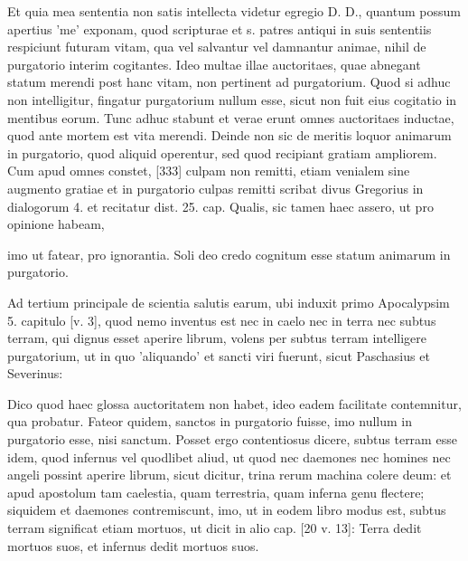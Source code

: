 Et quia mea sententia non satis intellecta videtur egregio D. D., quantum possum apertius 'me' exponam, quod scripturae et s. patres antiqui in suis sententiis respiciunt futuram vitam, qua vel salvantur vel damnantur animae, nihil de purgatorio interim cogitantes. Ideo multae illae auctoritaes, quae abnegant statum merendi post hanc vitam, non pertinent ad purgatorium. Quod si adhuc non intelligitur, fingatur purgatorium nullum esse, sicut non fuit eius cogitatio in mentibus eorum. Tunc adhuc stabunt et verae erunt omnes auctoritaes inductae, quod ante mortem est vita merendi. Deinde non sic de meritis loquor animarum in purgatorio, quod aliquid operentur, sed quod recipiant gratiam ampliorem. Cum apud omnes constet, [333] culpam non remitti, etiam venialem sine augmento gratiae et in purgatorio culpas remitti scribat divus Gregorius in dialogorum 4. et recitatur dist. 25. cap. Qualis, sic tamen haec assero, ut pro opinione habeam,

imo ut fatear, pro ignorantia. Soli deo credo cognitum esse statum animarum in purgatorio.

Ad tertium principale de scientia salutis earum, ubi induxit primo Apocalypsim 5. capitulo [v. 3], quod nemo inventus est nec in caelo nec in terra nec subtus terram, qui dignus esset aperire librum, volens per subtus terram intelligere purgatorium, ut in quo 'aliquando' et sancti viri fuerunt, sicut Paschasius et Severinus:

Dico quod haec glossa auctoritatem non habet, ideo eadem facilitate contemnitur, qua probatur. Fateor quidem, sanctos in purgatorio fuisse, imo nullum in purgatorio esse, nisi sanctum. Posset ergo contentiosus dicere, subtus terram esse idem, quod infernus vel quodlibet aliud, ut quod nec daemones nec homines nec angeli possint aperire librum, sicut dicitur, trina rerum machina colere deum: et apud apostolum tam caelestia, quam terrestria, quam inferna genu flectere; siquidem et daemones contremiscunt, imo, ut in eodem libro modus est, subtus terram significat etiam mortuos, ut dicit in alio cap. [20 v. 13]: Terra dedit mortuos suos, et infernus dedit mortuos suos.

